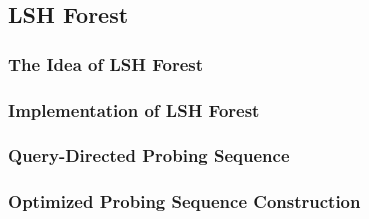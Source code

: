 \subsection{LSH Forest}
\begin{frame}
\frametitle{The Idea of LSH Forest}
\end{frame}

\begin{frame}
	\frametitle{Implementation of LSH Forest}
\end{frame}

\begin{frame}
	\frametitle{Query-Directed Probing Sequence}
\end{frame}

\begin{frame}
	\frametitle{Optimized Probing Sequence Construction}
\end{frame}